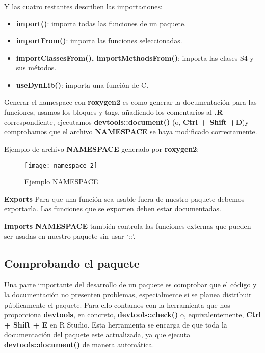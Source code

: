 Y las cuatro restantes describen las importaciones:
\begin{itemize}
    \item \textbf{import()}: importa todas las funciones de un paquete.
    \item \textbf{importFrom()}: importa las funciones seleccionadas.
    \item \textbf{importClassesFrom(), importMethodsFrom()}: importa las clases S4 y sus
m\'etodos.
    \item \textbf{useDynLib()}: importa una funci\'on de C.
\end{itemize}

Generar el namespace con \textbf{roxygen2} es como generar la documentaci\'on para las funciones,
usamos los bloques y tags, a\~nadiendo los comentarios al \textbf{.R} correspondiente, ejecutamos
\textbf{devtools::document()} (o, \textbf{Ctrl + Shift +D})y comprobamos que el archivo \textbf{NAMESPACE} se
haya modificado correctamente.

Ejemplo de archivo \textbf{NAMESPACE} generado por \textbf{roxygen2}:

\begin{figure}[H]
    \centering
    \texttt{[image: namespace\_2]}
    \caption{Ejemplo NAMESPACE }
    \label{fig:namespace}
\end{figure} 

\textbf{Exports}
Para que una funci\'on sea usable fuera de nuestro paquete debemos exportarla. Las funciones que se exporten deben estar documentadas.

\textbf{Imports}
\textbf{NAMESPACE} tambi\'en controla las funciones externas que pueden ser usadas en nuestro
paquete sin usar \enquote*{::}.

\subsection{Comprobando el paquete}

Una parte importante del desarrollo de un paquete es comprobar que el c\'odigo y la
documentaci\'on no presenten problemas, especialmente si se planea distribuir p\'ublicamente
el paquete. Para ello contamos con la herramienta que nos proporciona \textbf{devtools}, en concreto,
\textbf{devtools::check()} o, equivalentemente, \textbf{Ctrl + Shift + E} en R Studio.
Esta herramienta se encarga de que toda la documentaci\'on del paquete este actualizada, ya
que ejecuta \textbf{devtools::document()} de manera autom\'atica.

